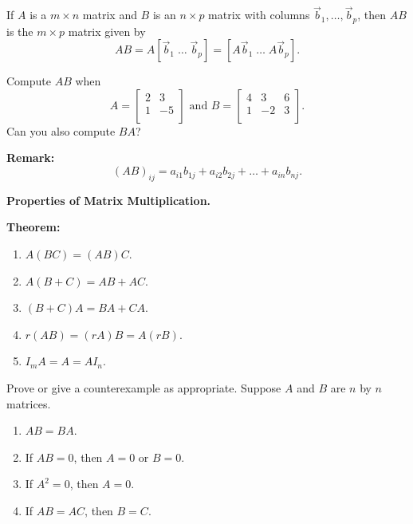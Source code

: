 \begin{defn}
If $A$ is a $m\times n$ matrix and $B$ is an $n\times p$ matrix with columns $\vec{b}_1, \dots, \vec{b}_p$, then $AB$ is the $m \times p$ matrix given by $$AB=A[\vec{b}_1 \; \dots \; \vec{b}_p]=[A\vec{b}_1 \; \dots \; A\vec{b}_p].$$
\end{defn}

\begin{enumerate}

\Problem Compute $AB$ when $$A=\begin{bmatrix} 2 & 3\\ 1 & -5\\ \end{bmatrix} \text{ and } B=\begin{bmatrix} 4 & 3 & 6\\ 1 & -2 & 3\\ \end{bmatrix}.$$ Can you also compute $BA$?

\newpage


{\bf Remark:}
$$(AB)_{ij}=a_{i1}b_{1j}+a_{i2}b_{2j}+\dots+a_{in}b_{nj}.$$

{\bf Properties of Matrix Multiplication.}

{\bf Theorem:}
\begin{enumerate}
\item $A(BC)=(AB)C$.
\item $A(B+C)=AB+AC$.
\item $(B+C)A=BA+CA$.
\item $r(AB)=(rA)B=A(rB)$.
\item $I_m A =A = AI_n$.
\end{enumerate}

 Prove or give a counterexample as appropriate. Suppose $A$ and $B$ are $n$ by $n$ matrices.

\begin{enumerate}
\item $AB=BA$.

\vfill

\item If $AB=0$, then $A=0$ or $B=0$.

\vfill

\item If $A^2=0$, then $A=0$.

\vfill

\item If $AB=AC$, then $B=C$.

\vfill


\end{enumerate}
\end{enumerate}
